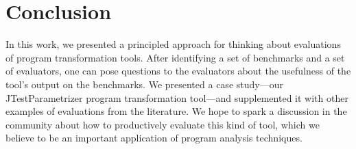 \section{Conclusion}
In this work, we presented a principled approach for thinking about
evaluations of program transformation tools. After identifying
a set of benchmarks and a set of evaluators, one can pose questions
to the evaluators about the usefulness of the tool's output on the benchmarks.
We presented a case study---our JTestParametrizer program transformation tool---and
supplemented it with other examples of evaluations from the literature.
We hope to spark a discussion in the community about how to
productively evaluate this kind of tool, which we believe to be an
important application of program analysis techniques.

